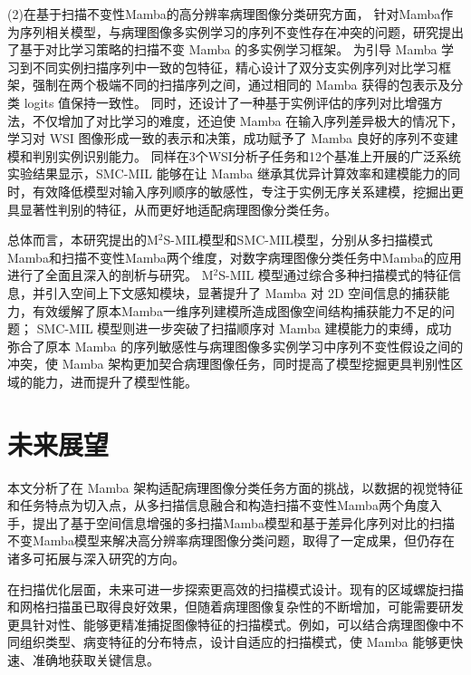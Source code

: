(2)在基于扫描不变性Mamba的高分辨率病理图像分类研究方面，
针对Mamba作为序列相关模型，与病理图像多实例学习的序列不变性存在冲突的问题，研究提出了基于对比学习策略的扫描不变 Mamba 的多实例学习框架。
为引导 Mamba 学习到不同实例扫描序列中一致的包特征，精心设计了双分支实例序列对比学习框架，强制在两个极端不同的扫描序列之间，通过相同的 Mamba 获得的包表示及分类 logits 值保持一致性。
同时，还设计了一种基于实例评估的序列对比增强方法，不仅增加了对比学习的难度，还迫使 Mamba 在输入序列差异极大的情况下，学习对 WSI 图像形成一致的表示和决策，成功赋予了 Mamba 良好的序列不变建模和判别实例识别能力。
同样在3个WSI分析子任务和12个基准上开展的广泛系统实验结果显示，SMC-MIL 能够在让 Mamba 继承其优异计算效率和建模能力的同时，有效降低模型对输入序列顺序的敏感性，专注于实例无序关系建模，挖掘出更具显著性判别的特征，从而更好地适配病理图像分类任务。​

总体而言，本研究提出的M$^2$S-MIL模型和SMC-MIL模型，分别从多扫描模式Mamba和扫描不变性Mamba两个维度，对数字病理图像分类任务中Mamba的应用进行了全面且深入的剖析与研究。
M$^2$S-MIL 模型通过综合多种扫描模式的特征信息，并引入空间上下文感知模块，显著提升了 Mamba 对 2D 空间信息的捕获能力，有效缓解了原本Mamba一维序列建模所造成图像空间结构捕获能力不足的问题；
SMC-MIL 模型则进一步突破了扫描顺序对 Mamba 建模能力的束缚，成功弥合了原本 Mamba 的序列敏感性与病理图像多实例学习中序列不变性假设之间的冲突，使 Mamba 架构更加契合病理图像任务，同时提高了模型挖掘更具判别性区域的能力，进而提升了模型性能。​


\section[\hspace{-2pt}未来展望]{{\heiti{} \hspace{-8pt}未来展望}}\label{section5: 未来展望}

本文分析了在 Mamba 架构适配病理图像分类任务方面的挑战，以数据的视觉特征和任务特点为切入点，从多扫描信息融合和构造扫描不变性Mamba两个角度入手，提出了基于空间信息增强的多扫描Mamba模型和基于差异化序列对比的扫描不变Mamba模型来解决高分辨率病理图像分类问题，取得了一定成果，但仍存在诸多可拓展与深入研究的方向。​

在扫描优化层面，未来可进一步探索更高效的扫描模式设计。现有的区域螺旋扫描和网格扫描虽已取得良好效果，但随着病理图像复杂性的不断增加，可能需要研发更具针对性、能够更精准捕捉图像特征的扫描模式。例如，可以结合病理图像中不同组织类型、病变特征的分布特点，设计自适应的扫描模式，使 Mamba 能够更快速、准确地获取关键信息。​

